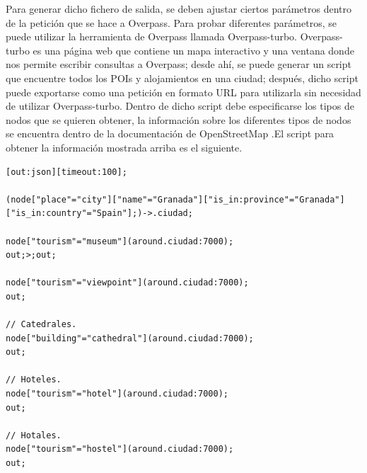 Para generar dicho fichero de salida, se deben ajustar ciertos parámetros dentro de la petición que se hace a Overpass. Para probar diferentes parámetros, se puede utilizar la herramienta de Overpass llamada Overpass-turbo.\newline
Overpass-turbo es una página web que contiene un mapa interactivo y una ventana donde nos permite escribir consultas a Overpass; desde ahí, se puede generar un script que encuentre todos los POIs y alojamientos en una ciudad; después, dicho script puede exportarse como una petición en formato URL para utilizarla sin necesidad de utilizar Overpass-turbo. Dentro de dicho script debe especificarse los tipos de nodos que se quieren obtener, la información sobre los diferentes tipos de nodos se encuentra dentro de la documentación de OpenStreetMap \cite{openstreetmap_doc}.El script para obtener la información mostrada arriba es el siguiente. \newline
\begin{lstlisting}[caption=Script para encontrar todos los POIs y alojamientos de una ciudad.]
[out:json][timeout:100]; 

(node["place"="city"]["name"="Granada"]["is_in:province"="Granada"]["is_in:country"="Spain"];)->.ciudad; 

node["tourism"="museum"](around.ciudad:7000);
out;>;out;

node["tourism"="viewpoint"](around.ciudad:7000);
out;

// Catedrales.
node["building"="cathedral"](around.ciudad:7000);
out;

// Hoteles.
node["tourism"="hotel"](around.ciudad:7000);
out;

// Hotales.
node["tourism"="hostel"](around.ciudad:7000);
out;
\end{lstlisting}

